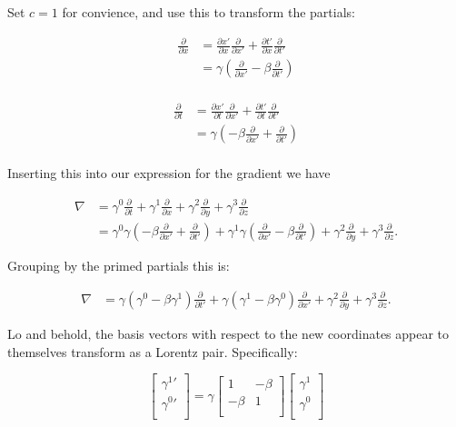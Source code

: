 \documentclass{article}      %
\newcommand{\grad}[0]{\nabla}
\newcommand{\Partial}[2]{\frac{\partial {#1}}{\partial {#2}}}
\begin{document}
Set $c=1$ for convience, and use this to transform the partials:

\begin{align*}
\Partial{}{x} 
&= \Partial{x'}{x} \Partial{}{x'} + \Partial{t'}{x} \Partial{}{t'} \\
&= \gamma \left( \Partial{}{x'} -\beta \Partial{}{t'} \right) \\
\end{align*}

\begin{align*}
\Partial{}{t} 
&= \Partial{x'}{t} \Partial{}{x'} + \Partial{t'}{t} \Partial{}{t'} \\
&= \gamma \left( -\beta \Partial{}{x'} + \Partial{}{t'} \right) \\
\end{align*}

Inserting this into our expression for the gradient we have

\begin{align*}
\grad 
&= \gamma^0 \Partial{}{t}
 + \gamma^1 \Partial{}{x} 
 + \gamma^2 \Partial{}{y}
 + \gamma^3 \Partial{}{z} \\
&= \gamma^0 \gamma \left( -\beta \Partial{}{x'} + \Partial{}{t'} \right) 
 + \gamma^1 \gamma \left( \Partial{}{x'} -\beta \Partial{}{t'} \right)
 + \gamma^2 \Partial{}{y}
 + \gamma^3 \Partial{}{z}.
\end{align*}

Grouping by the primed partials this is:

\begin{align*}
\grad 
&= \gamma \left(\gamma^0 - \beta\gamma^1\right) \Partial{}{t'}
 + \gamma \left(\gamma^1 - \beta\gamma^0\right) \Partial{}{x'}
 + \gamma^2 \Partial{}{y}
 + \gamma^3 \Partial{}{z}.
\end{align*}

Lo and behold, the basis vectors with respect to the new coordinates appear to themselves transform as a Lorentz pair.  Specifically:

\begin{equation*}
\begin{bmatrix}
{\gamma^1}' \\
{\gamma^0}' \\
\end{bmatrix}
=
\gamma
\begin{bmatrix}
1 & -\beta \\
-\beta & 1 \\
\end{bmatrix}
\begin{bmatrix}
{\gamma^1} \\
{\gamma^0} \\
\end{bmatrix}
\end{equation*}
\end{document}
